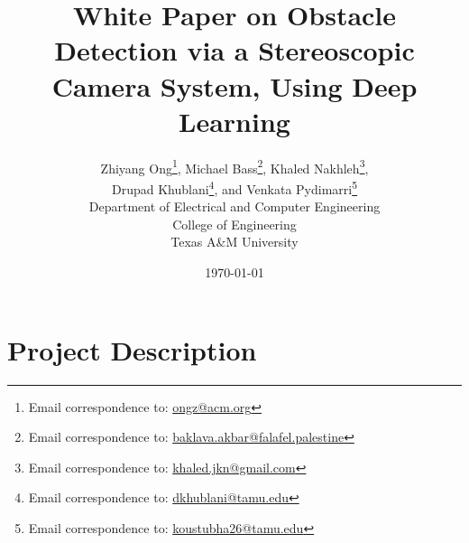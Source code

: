 \documentclass[letter,12pt]{article}
\begin{document}
\title{White Paper on Obstacle Detection via a Stereoscopic Camera System, Using Deep Learning}
\date{\today}
\author{Zhiyang Ong\thanks{Email correspondence to: \href{mailto:ongz@acm.org}{ongz@acm.org}}, Michael Bass\thanks{Email correspondence to: \href{mailto:baklava.akbar@falafel.palestine}{baklava.akbar@falafel.palestine}}, Khaled Nakhleh\thanks{Email correspondence to: \href{mailto:khaled.jkn@gmail.com}{khaled.jkn@gmail.com}}, \\
Drupad Khublani\thanks{Email correspondence to: \href{mailto:dkhublani@tamu.edu}{dkhublani@tamu.edu}}, and Venkata Pydimarri\thanks{Email correspondence to: \href{mailto:koustubha26@tamu.edu}{koustubha26@tamu.edu}} \\
Department of Electrical and Computer Engineering \\
College of Engineering \\
Texas A\&M University
}
\maketitle





\section{Project Description}
\label{sec:ProjectDescription}

%
%
\end{document}

